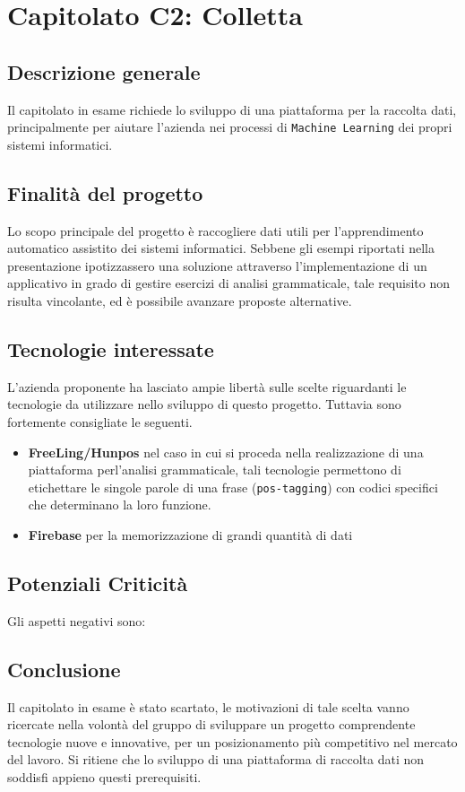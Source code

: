 \chapter{Capitolato C2: Colletta}
\section{Descrizione generale}
Il capitolato in esame richiede lo sviluppo di una piattaforma per la raccolta dati, principalmente per aiutare l'azienda nei processi di \texttt{Machine Learning} dei propri sistemi informatici.

\section{Finalit\`a del progetto}
Lo scopo principale del progetto è raccogliere dati utili per l'apprendimento automatico assistito dei sistemi informatici. Sebbene gli esempi riportati nella presentazione ipotizzassero una soluzione attraverso l'implementazione di un applicativo in grado di gestire esercizi di analisi grammaticale, tale requisito non risulta vincolante, ed è possibile avanzare proposte alternative.

\section{Tecnologie interessate}
L'azienda proponente ha lasciato ampie libertà sulle scelte riguardanti le tecnologie da utilizzare nello sviluppo di questo progetto. Tuttavia sono fortemente consigliate le seguenti.
\begin{itemize}
	\item \textbf{FreeLing/Hunpos} nel caso in cui si proceda nella realizzazione di una piattaforma perl'analisi grammaticale, tali tecnologie permettono di etichettare le singole parole di una frase (\texttt{pos-tagging}) con codici specifici che determinano la loro funzione.
	\item \textbf{Firebase} per la memorizzazione di grandi quantità di dati
\end{itemize}
\section{Potenziali Criticità}
Gli aspetti negativi sono:
\section{Conclusione}
Il capitolato in esame è stato scartato, le motivazioni di tale scelta vanno ricercate nella volontà del gruppo di sviluppare un progetto comprendente tecnologie nuove e innovative, per un posizionamento più competitivo nel mercato del lavoro. Si ritiene che lo sviluppo di una piattaforma di raccolta dati non soddisfi appieno questi prerequisiti. 
